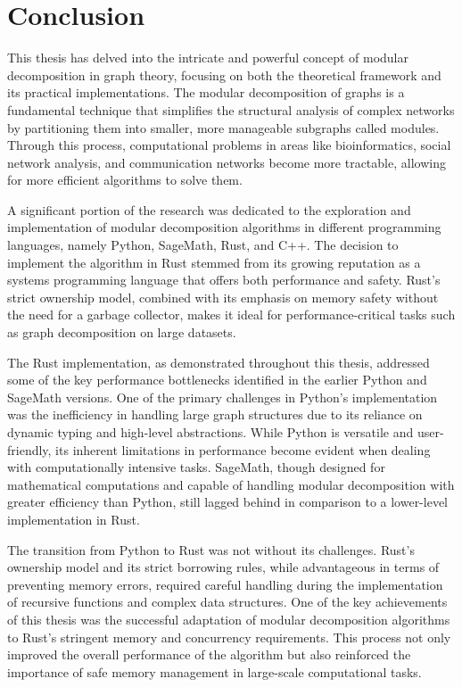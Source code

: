 

\chapter{Conclusion}\label{ch:conclusion}

This thesis has delved into the intricate and powerful concept of modular decomposition in graph theory, focusing on both the theoretical framework and its practical implementations.
The modular decomposition of graphs is a fundamental technique that simplifies the structural analysis of complex networks by partitioning them into smaller, more manageable subgraphs called modules.
Through this process, computational problems in areas like bioinformatics, social network analysis, and communication networks become more tractable, allowing for more efficient algorithms to solve them.

A significant portion of the research was dedicated to the exploration and implementation of modular decomposition algorithms in different programming languages, namely Python, SageMath, Rust, and C++.
The decision to implement the algorithm in Rust stemmed from its growing reputation as a systems programming language that offers both performance and safety.
Rust’s strict ownership model, combined with its emphasis on memory safety without the need for a garbage collector, makes it ideal for performance-critical tasks such as graph decomposition on large datasets.

The Rust implementation, as demonstrated throughout this thesis, addressed some of the key performance bottlenecks identified in the earlier Python and SageMath versions.
One of the primary challenges in Python's implementation was the inefficiency in handling large graph structures due to its reliance on dynamic typing and high-level abstractions.
While Python is versatile and user-friendly, its inherent limitations in performance become evident when dealing with computationally intensive tasks.
SageMath, though designed for mathematical computations and capable of handling modular decomposition with greater efficiency than Python, still lagged behind in comparison to a lower-level implementation in Rust.

The transition from Python to Rust was not without its challenges.
Rust’s ownership model and its strict borrowing rules, while advantageous in terms of preventing memory errors, required careful handling during the implementation of recursive functions and complex data structures.
One of the key achievements of this thesis was the successful adaptation of modular decomposition algorithms to Rust’s stringent memory and concurrency requirements.
This process not only improved the overall performance of the algorithm but also reinforced the importance of safe memory management in large-scale computational tasks.

